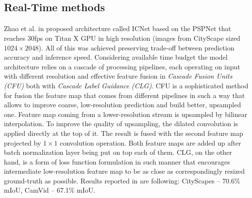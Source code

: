 \documentclass{article}
\begin{document}
\subsection{Real-Time methods}
\label{sec:rt_methods}
\paragraph{}
Zhao et al. in \cite{icnet} proposed architecture called ICNet based on the PSPNet \cite{psp} that reaches 30fps on Titan X GPU in high resolution (images from CityScape \cite{cityscapes} sized $1024 \times 2048$). All of this was achieved preserving trade-off between prediction accuracy and inference speed. Considering available time budget the model architecture relies on a cascade of processing pipelines, each operating on input with different resolution and effective feature fusion in \textit{Cascade Fusion Units (CFU)} both with \textit{Cascade Label Guidance (CLG)}. CFU is a sophisticated method for fusion the feature map that comes from different pipelines in such a way that allows to improve coarse, low-resolution prediction and build better, upsampled one. Feature map coming from a lower-resolution stream is upsampled by bilinear interpolation. To improve the quality of upsampling, the dilated convolution is applied directly at the top of it. The result is fused with the second feature map projected by $1 \times 1$ convolution operation. Both feature maps are added up after batch normalization layer being put on top each of them. CLG, on the other hand, is a form of loss function formulation in such manner that encourages intermediate low-resolution feature map to be as close as correspondingly resized ground-truth as possible. Results reported in \cite{icnet} are following: CityScapes \cite{cityscapes} -- 70.6\% mIoU, CamVid \cite{camvid} -- 67.1\% mIoU. 
\end{document}

